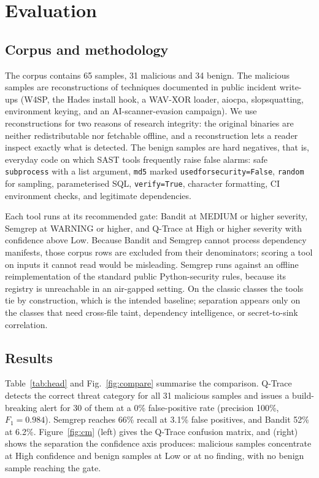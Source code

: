 \documentclass[runningheads]{llncs}
\newcommand{\pct}{\%}
\begin{document}
\section{Evaluation}\label{sec:eval}
\subsection{Corpus and methodology}
The corpus contains 65 samples, 31 malicious and 34 benign. The malicious samples
are reconstructions of techniques documented in public incident write-ups (W4SP,
the Hades install hook, a WAV-XOR loader, aiocpa, slopsquatting, environment
keying, and an AI-scanner-evasion campaign). We use reconstructions for two
reasons of research integrity: the original binaries are neither redistributable
nor fetchable offline, and a reconstruction lets a reader inspect exactly what is
detected. The benign samples are hard negatives, that is, everyday code on which
SAST tools frequently raise false alarms: safe \texttt{subprocess} with a list
argument, \texttt{md5} marked \texttt{usedforsecurity=False}, \texttt{random} for
sampling, parameterised SQL, \texttt{verify=True}, character formatting, CI
environment checks, and legitimate dependencies.

Each tool runs at its recommended gate: Bandit at MEDIUM or higher severity,
Semgrep at WARNING or higher, and Q-Trace at High or higher severity with
confidence above Low. Because Bandit and Semgrep cannot process dependency
manifests, those corpus rows are excluded from their denominators; scoring a tool
on inputs it cannot read would be misleading. Semgrep runs against an offline
reimplementation of the standard public Python-security rules, because its
registry is unreachable in an air-gapped setting. On the classic classes the tools
tie by construction, which is the intended baseline; separation appears only on the
classes that need cross-file taint, dependency intelligence, or secret-to-sink
correlation.

\subsection{Results}
Table~\ref{tab:head} and Fig.~\ref{fig:compare} summarise the comparison. Q-Trace
detects the correct threat category for all 31 malicious samples and issues a
build-breaking alert for 30 of them at a 0\pct{} false-positive rate
(precision 100\pct{}, $F_1 = 0.984$). Semgrep reaches 66\pct{} recall at 3.1\pct{}
false positives, and Bandit 52\pct{} at 6.2\pct{}. Figure~\ref{fig:cm} (left) gives the
Q-Trace confusion matrix, and (right) shows the separation the confidence axis
produces: malicious samples concentrate at High confidence and benign samples at
Low or at no finding, with no benign sample reaching the gate.
\end{document}
